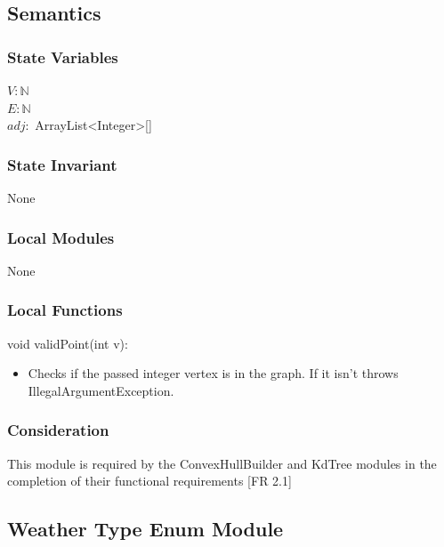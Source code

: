 \documentclass[12pt]{article}
\begin{document}
                \subsection* {Semantics}
                    \subsubsection *{State Variables} 
                        $V: \mathbb{N}$\\
                        $E : \mathbb{N}$\\
                        $adj:$  ArrayList<Integer>[]
                    \subsubsection *{State Invariant}
                    
                    None
                    
                     \subsubsection* {Local Modules}
                     None
                
                \subsubsection*{Local Functions}
                
                \noindent void validPoint(int v):
			    \begin{itemize}
			        \item Checks if the passed integer vertex is in the graph. If it isn't throws IllegalArgumentException.
			    \end{itemize}
			    
                    \subsubsection*{Consideration}
                    This module is required by the ConvexHullBuilder and KdTree modules in the completion of their functional requirements [FR 2.1]
                   \newpage
                 \newpage
                \subsection* {Weather Type Enum Module}
                
\end{document}
